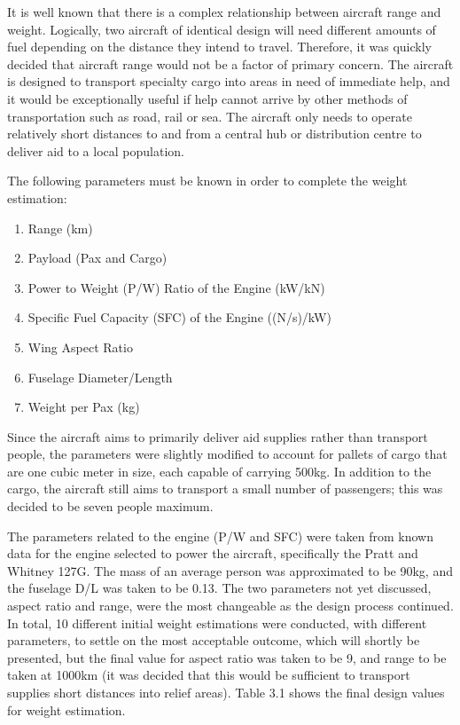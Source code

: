 \documentclass[stu, a4paper, 12pt, floatsintext]{apa7}
\numberwithin{figure}{section}
\numberwithin{table}{section}
\numberwithin{equation}{section}
\begin{document}
It is well known that there is a complex relationship between aircraft range and weight. Logically, two aircraft of identical design will need different amounts of fuel depending on the distance they intend to travel. Therefore, it was quickly decided that aircraft range would not be a factor of primary concern. The aircraft is designed to transport specialty cargo into areas in need of immediate help, and it would be exceptionally useful if help cannot arrive by other methods of transportation such as road, rail or sea. The aircraft only needs to operate relatively short distances to and from a central hub or distribution centre to deliver aid to a local population. 

The following parameters must be known in order to complete the weight estimation:
\begin{enumerate}
    \item Range (km)
    \item Payload (Pax and Cargo)
    \item Power to Weight (P/W) Ratio of the Engine (kW/kN)
    \item Specific Fuel Capacity (SFC) of the Engine ((N/s)/kW)
    \item Wing Aspect Ratio
    \item Fuselage Diameter/Length
    \item Weight per Pax (kg)
\end{enumerate}

Since the aircraft aims to primarily deliver aid supplies rather than transport people, the parameters were slightly modified to account for pallets of cargo that are one cubic meter in size, each capable of carrying 500kg. In addition to the cargo, the aircraft still aims to transport a small number of passengers; this was decided to be seven people maximum.

The parameters related to the engine (P/W and SFC) were taken from known data for the engine selected to power the aircraft, specifically the Pratt and Whitney 127G. The mass of an average person was approximated to be 90kg, and the fuselage D/L was taken to be 0.13. The two parameters not yet discussed, aspect ratio and range, were the most changeable as the design process continued. In total, 10 different initial weight estimations were conducted, with different parameters, to settle on the most acceptable outcome, which will shortly be presented, but the final value for aspect ratio was taken to be 9, and range to be taken at 1000km (it was decided that this would be sufficient to transport supplies short distances into relief areas). Table 3.1 shows the final design values for weight estimation. 
\end{document}
